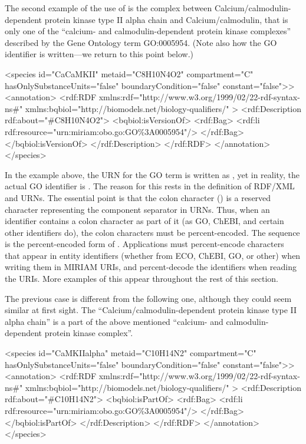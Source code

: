 The second example of the use of  is the
complex between Calcium/calmodulin-dependent protein kinase type
II alpha chain and Calcium/calmodulin, that is only one of the
``calcium- and calmodulin-dependent protein kinase complexes''
described by the Gene Ontology term GO:0005954.  (Note also how
the GO identifier is written---we return to this point below.)

\begin{example}
<species id="CaCaMKII" metaid="C8H10N4O2" compartment="C"
         hasOnlySubstanceUnits="false" boundaryCondition="false"
         constant="false">>
  <annotation>
    <rdf:RDF
      xmlns:rdf="http://www.w3.org/1999/02/22-rdf-syntax-ns\#"
      xmlns:bqbiol="http://biomodels.net/biology-qualifiers/"
    >
      <rdf:Description rdf:about="\#C8H10N4O2">
        <bqbiol:isVersionOf>
          <rdf:Bag>
            <rdf:li rdf:resource="urn:miriam:obo.go:GO\%3A0005954"/>
          </rdf:Bag>
        </bqbiol:isVersionOf>
      </rdf:Description>
    </rdf:RDF>
  </annotation>
</species>
\end{example}

In the example above, the URN for the GO term is written as
, yet in reality, the actual GO identifier is
.  The reason for this rests in the definition
of RDF/XML and URNs.  The essential point is that the colon
character (\val{:}) is a reserved character representing the
component separator in URNs.  Thus, when an identifier contains a
colon character as part of it (as GO, ChEBI, and certain other
identifiers do), the colon characters must be percent-encoded.
The sequence  is the percent-encoded form of \val{:}.
Applications must percent-encode \val{:} characters that appear in
entity identifiers (whether from ECO, ChEBI, GO, or other) when
writing them in MIRIAM URIs, and percent-decode the identifiers
when reading the URIs.  More examples of this appear throughout
the rest of this section.

The previous case is different from the following one, although they
could seem similar at first sight. The
``Calcium/calmodulin-dependent protein kinase type II alpha
chain'' is a part of the above mentioned ``calcium- and
calmodulin-dependent protein kinase complex''.

\begin{example}
<species id="CaMKIIalpha" metaid="C10H14N2" compartment="C"
         hasOnlySubstanceUnits="false" boundaryCondition="false"
         constant="false">>
  <annotation>
    <rdf:RDF
      xmlns:rdf="http://www.w3.org/1999/02/22-rdf-syntax-ns\#"
      xmlns:bqbiol="http://biomodels.net/biology-qualifiers/"
    >
      <rdf:Description rdf:about="\#C10H14N2">
        <bqbiol:isPartOf>
          <rdf:Bag>
            <rdf:li rdf:resource="urn:miriam:obo.go:GO\%3A0005954"/>
          </rdf:Bag>
        </bqbiol:isPartOf>
      </rdf:Description>
    </rdf:RDF>
  </annotation>
</species>
\end{example}

